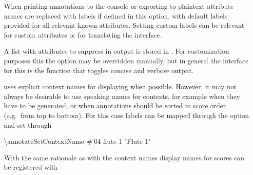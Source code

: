 \documentclass[]{ollmanual}
\newenvironment{Shaded}{}{}
\newcommand{\DecValTok}[1]{\textcolor[rgb]{0.25,0.63,0.44}{#1}}
\newcommand{\FloatTok}[1]{\textcolor[rgb]{0.25,0.63,0.44}{#1}}
\newcommand{\FunctionTok}[1]{\textcolor[rgb]{0.02,0.16,0.49}{#1}}
\newcommand{\NormalTok}[1]{#1}
\newcommand{\StringTok}[1]{\textcolor[rgb]{0.25,0.44,0.63}{#1}}
\begin{document}

When printing annotations to the console or exporting to plaintext
attribute names are replaced with labels if defined in this option, with
default labels provided for all relevant known attributes. Setting
custom labels can be relevant for custom attributes or for translating
the interface.


A list with attributes to suppress in output is stored in
. For customization
purposes this the option may be overridden manually, but in general the
interface for this is the function
 that toggles concise and
verbose output.


 uses explicit context names for
displaying when possible. However, it may not always be desirable to use
speaking names for contexts, for example when they have to be generated,
or when annotations should be sorted in score order (e.g.~from top to
bottom). For this case labels can be mapped through the
 option and set through

\begin{Shaded}
\begin{Highlighting}[]
\FunctionTok{\textbackslash{}annotateSetContextName}\NormalTok{ #}\FloatTok{'}\DecValTok{04}\FloatTok{-flute-1}\NormalTok{ "}\StringTok{Flute 1"}
\end{Highlighting}
\end{Shaded}


With the same rationale as with the context names display names for
scores can be registered with

\end{document}
